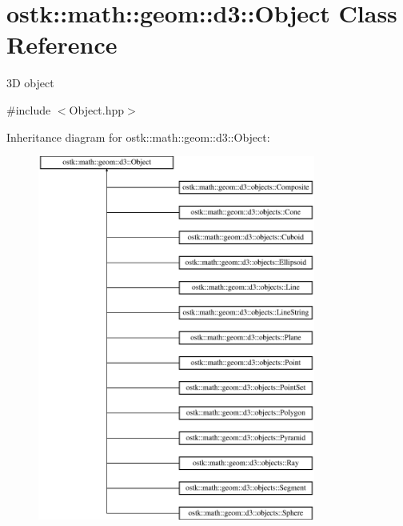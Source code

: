 \hypertarget{classostk_1_1math_1_1geom_1_1d3_1_1_object}{}\section{ostk\+:\+:math\+:\+:geom\+:\+:d3\+:\+:Object Class Reference}
\label{classostk_1_1math_1_1geom_1_1d3_1_1_object}


3D object  




{\ttfamily \#include $<$Object.\+hpp$>$}

Inheritance diagram for ostk\+:\+:math\+:\+:geom\+:\+:d3\+:\+:Object\+:\begin{figure}[H]
\begin{center}
\leavevmode
\includegraphics[height=12.000000cm]{classostk_1_1math_1_1geom_1_1d3_1_1_object}
\end{center}
\end{figure}
